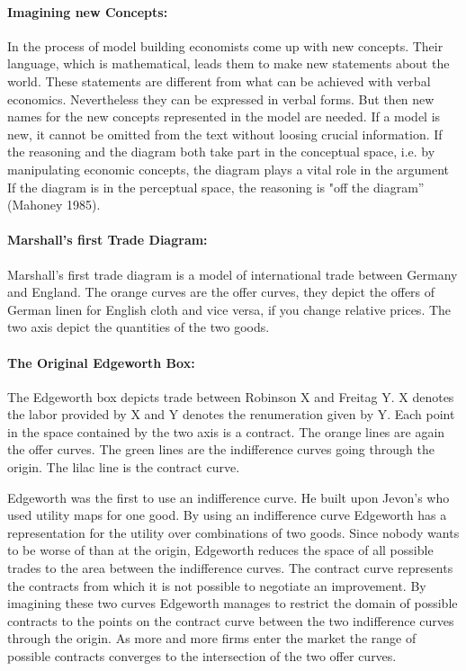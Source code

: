\documentclass[12pt,a4paper]{article}
\begin{document}
\paragraph{Imagining new Concepts:}
In the process of model building economists come up with new concepts. Their language, which is mathematical, leads them to make new statements about the world. These statements are different from what can be achieved with verbal economics. Nevertheless they can be expressed in verbal forms. But then new names for the new concepts represented in the model are needed. If a model is new, it cannot be omitted from the text without loosing crucial information. 
If the reasoning and the diagram both take part in the conceptual space, i.e. by manipulating economic concepts, the diagram plays a vital role in the argument If the diagram is in the perceptual space, the reasoning is "off the diagram” (Mahoney 1985).

\paragraph{Marshall's first Trade Diagram:}
Marshall's first trade diagram is a model of international trade between Germany and England. 
The orange curves are the offer curves, they depict the offers of German linen for English cloth and vice versa, if you change relative prices. The two axis depict the quantities of the two goods.

\paragraph{The Original Edgeworth Box:}
The Edgeworth box depicts trade between Robinson X and Freitag Y. X denotes the labor provided by X and Y denotes the renumeration given by Y. Each point in the space contained by the two axis is a contract. The orange lines are again the offer curves. The green lines are the indifference curves going through the origin. The lilac line is the contract curve.

Edgeworth was the first to use an indifference curve. He built upon Jevon's who used utility maps for one good. By using an indifference curve Edgeworth has a representation for the utility over combinations of two goods. Since nobody wants to be worse of than at the origin, Edgeworth reduces the space of all possible trades to the area between the indifference curves. The contract curve represents the contracts from which it is not possible to negotiate an improvement.
By imagining these two curves Edgeworth manages to restrict the domain of possible contracts to the points on the contract curve between the two indifference curves through the origin.
As more and more firms enter the market the range of possible contracts converges to the intersection of the two offer curves.
\end{document}
